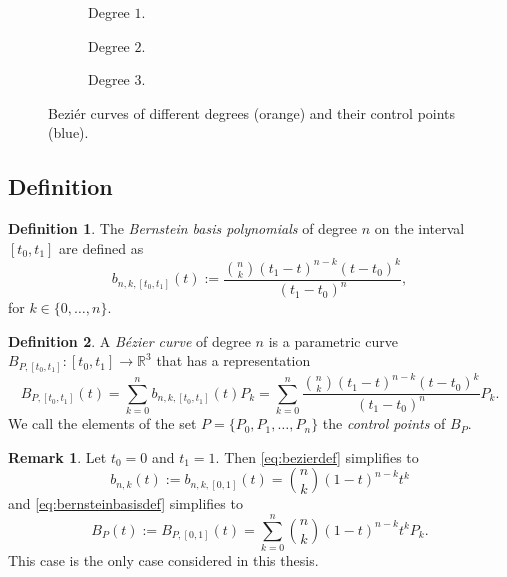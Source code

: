 \documentclass[a4paper, 11pt]{report}
\theoremstyle{definition}
\newtheorem{definition}{Definition}[section]
\newtheorem*{remark}{Remark}
\renewcommand{\emph}[1]{\textit{#1}}
\begin{document}
\begin{figure}[!ht]
	\centering
	\begin{subfigure}{0.25\textwidth}
		
		\caption{Degree $1$.}
	\end{subfigure}
	\begin{subfigure}{0.25\textwidth}
		
		\caption{Degree $2$.}
	\end{subfigure}
	\begin{subfigure}{0.25\textwidth}
		
		\caption{Degree $3$.}
	\end{subfigure}
	\caption{Beziér curves of different degrees (orange) and their control points (blue).}
\end{figure}

\subsection{Definition}
\begin{definition}
	The \emph{Bernstein basis polynomials} of degree $n$ on the interval $[t_0,t_1]$ are defined as
	\begin{equation}\label{eq:bernsteinbasisdef}
		b_{n,k,[t_0, t_1]}(t) := \frac{\binom{n}{k} (t_1-t)^{n-k}(t-t_0)^k}{(t_1-t_0)^n},
	\end{equation}
	for $k \in \{0,\dots, n\}$.
\end{definition}

\begin{definition}
	A \emph{Bézier curve} of degree $n$ is a parametric curve $B_{P,[t_0, t_1]}: [t_0, t_1] \rightarrow \mathbb{R}^3$ that has a representation
	\begin{equation}\label{eq:bezierdef}
		B_{P, [t_0, t_1]}(t) = \sum_{k=0}^n b_{n,k,[t_0, t_1]}(t) P_k = \sum_{k=0}^n \frac{\binom{n}{k} (t_1-t)^{n-k}(t-t_0)^k}{(t_1-t_0)^n} P_k.
	\end{equation}
	We call the elements of the set $P = \{P_0, P_1, \dots, P_n\}$ the \emph{control points} of $B_P$.
\end{definition}

\begin{remark}
	Let $t_0 = 0$ and $t_1 = 1$. Then \ref{eq:bezierdef} simplifies to
	\begin{equation}
		b_{n,k}(t) := b_{n,k,[0,1]}(t) = \binom{n}{k} (1-t)^{n-k}t^k
	\end{equation}
	and \ref{eq:bernsteinbasisdef} simplifies to
	\begin{equation}\label{eq:bezierdefshort}
		B_P(t) := B_{P,[0,1]}(t)= \sum_{k=0}^n \binom{n}{k} (1-t)^{n-k}t^k P_k.
	\end{equation}
	This case is the only case considered in this thesis.
\end{remark}
\end{document}
